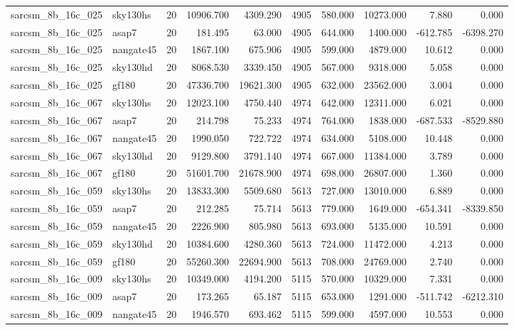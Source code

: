 \begin{longtable}{llrrrrrrrr}
sarcsm\_8b\_16c\_025 & sky130hs & 20 & 10906.700 & 4309.290 & 4905 & 580.000 & 10273.000 & 7.880 & 0.000 \\
sarcsm\_8b\_16c\_025 & asap7 & 20 & 181.495 & 63.000 & 4905 & 644.000 & 1400.000 & -612.785 & -6398.270 \\
sarcsm\_8b\_16c\_025 & nangate45 & 20 & 1867.100 & 675.906 & 4905 & 599.000 & 4879.000 & 10.612 & 0.000 \\
sarcsm\_8b\_16c\_025 & sky130hd & 20 & 8068.530 & 3339.450 & 4905 & 567.000 & 9318.000 & 5.058 & 0.000 \\
sarcsm\_8b\_16c\_025 & gf180 & 20 & 47336.700 & 19621.300 & 4905 & 632.000 & 23562.000 & 3.004 & 0.000 \\
sarcsm\_8b\_16c\_067 & sky130hs & 20 & 12023.100 & 4750.440 & 4974 & 642.000 & 12311.000 & 6.021 & 0.000 \\
sarcsm\_8b\_16c\_067 & asap7 & 20 & 214.798 & 75.233 & 4974 & 764.000 & 1838.000 & -687.533 & -8529.880 \\
sarcsm\_8b\_16c\_067 & nangate45 & 20 & 1990.050 & 722.722 & 4974 & 634.000 & 5108.000 & 10.448 & 0.000 \\
sarcsm\_8b\_16c\_067 & sky130hd & 20 & 9129.800 & 3791.140 & 4974 & 667.000 & 11384.000 & 3.789 & 0.000 \\
sarcsm\_8b\_16c\_067 & gf180 & 20 & 51601.700 & 21678.900 & 4974 & 698.000 & 26807.000 & 1.360 & 0.000 \\
sarcsm\_8b\_16c\_059 & sky130hs & 20 & 13833.300 & 5509.680 & 5613 & 727.000 & 13010.000 & 6.889 & 0.000 \\
sarcsm\_8b\_16c\_059 & asap7 & 20 & 212.285 & 75.714 & 5613 & 779.000 & 1649.000 & -654.341 & -8339.850 \\
sarcsm\_8b\_16c\_059 & nangate45 & 20 & 2226.900 & 805.980 & 5613 & 693.000 & 5135.000 & 10.591 & 0.000 \\
sarcsm\_8b\_16c\_059 & sky130hd & 20 & 10384.600 & 4280.360 & 5613 & 724.000 & 11472.000 & 4.213 & 0.000 \\
sarcsm\_8b\_16c\_059 & gf180 & 20 & 55260.300 & 22694.900 & 5613 & 708.000 & 24769.000 & 2.740 & 0.000 \\
sarcsm\_8b\_16c\_009 & sky130hs & 20 & 10349.000 & 4194.200 & 5115 & 570.000 & 10329.000 & 7.331 & 0.000 \\
sarcsm\_8b\_16c\_009 & asap7 & 20 & 173.265 & 65.187 & 5115 & 653.000 & 1291.000 & -511.742 & -6212.310 \\
sarcsm\_8b\_16c\_009 & nangate45 & 20 & 1946.570 & 693.462 & 5115 & 599.000 & 4597.000 & 10.553 & 0.000 \\

\end{longtable}
